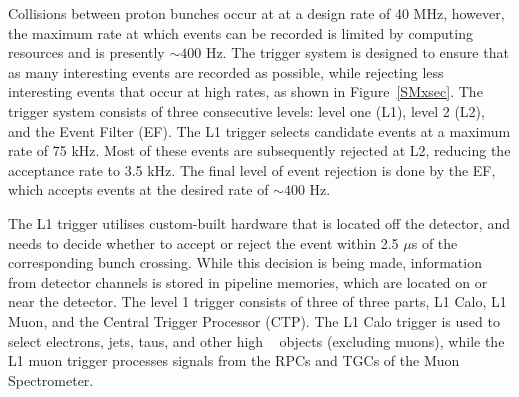 %
%


Collisions between proton bunches occur at \atlas at a design rate of 40 MHz, however, the maximum rate at which events can be recorded is limited by computing resources and is presently $\sim 400$ Hz. The trigger system is designed to ensure that as many interesting events are recorded as possible, while rejecting less interesting events that occur at high rates, as shown in Figure~\ref{SMxsec}. The \atlas trigger system consists of three consecutive levels: level one (L1), level 2 (L2), and the Event Filter (EF). The L1 trigger selects candidate events at a maximum rate of 75 kHz. Most of these events are subsequently rejected at L2, reducing the acceptance rate to 3.5 kHz. The final level of event rejection is done by the EF, which accepts events at the desired rate of $\sim 400$ Hz. 


The L1 trigger utilises custom-built hardware that is located off the detector, and needs to decide whether to accept or reject the event within 2.5 $\mu$s of the corresponding bunch crossing. While this decision is being made, information from detector channels is stored in pipeline memories, which are located on or near the detector.  The level 1 trigger consists of three of three parts, L1 Calo, L1 Muon, and the Central Trigger Processor (CTP). The L1 Calo trigger is used to select electrons, jets, taus, and other high \pt~ objects (excluding muons), while the L1 muon trigger processes signals from the RPCs and TGCs of the Muon Spectrometer. 

